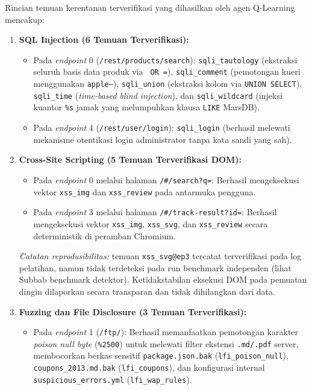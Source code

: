 \begin{enumerate}
Rincian temuan kerentanan terverifikasi yang dihasilkan oleh agen Q-Learning mencakup:
\begin{enumerate}
    \item \textbf{SQL Injection (6 Temuan Terverifikasi):}
    \begin{itemize}
        \item Pada \textit{endpoint} 0 (\texttt{/rest/products/search}): \texttt{sqli\_tautology} (ekstraksi seluruh basis data produk via \texttt{\textquotesingle\ OR \textquotesingle =}), \texttt{sqli\_comment} (pemotongan kueri menggunakan \texttt{apple\textquotesingle --}), \texttt{sqli\_union} (ekstraksi kolom via \texttt{UNION SELECT}), \texttt{sqli\_time} (\textit{time-based blind injection}), dan \texttt{sqli\_wildcard} (injeksi kuantor \texttt{\%s} jamak yang melumpuhkan klausa \texttt{LIKE} MarsDB).
        \item Pada \textit{endpoint} 4 (\texttt{/rest/user/login}): \texttt{sqli\_login} (berhasil melewati mekanisme otentikasi login administrator tanpa kata sandi yang sah).
    \end{itemize}
    \item \textbf{Cross-Site Scripting (5 Temuan Terverifikasi DOM):}
    \begin{itemize}
        \item Pada \textit{endpoint} 0 melalui halaman \texttt{/\#/search?q=}: Berhasil mengeksekusi vektor \texttt{xss\_img} dan \texttt{xss\_review} pada antarmuka pengguna.
        \item Pada \textit{endpoint} 3 melalui halaman \texttt{/\#/track-result?id=}: Berhasil mengeksekusi vektor \texttt{xss\_img}, \texttt{xss\_svg}, dan \texttt{xss\_review} secara deterministik di peramban Chromium.
    \end{itemize}
    \textit{Catatan reprodusibilitas:} temuan \texttt{xss\_svg@ep3} tercatat terverifikasi pada log pelatihan, namun tidak terdeteksi pada run benchmark independen (lihat Subbab benchmark detektor). Ketidakstabilan eksekusi DOM pada pemuatan dingin dilaporkan secara transparan dan tidak dihilangkan dari data. 
    \item \textbf{Fuzzing dan File Disclosure (3 Temuan Terverifikasi):}
    \begin{itemize}
        \item Pada \textit{endpoint} 1 (\texttt{/ftp/}): Berhasil memanfaatkan pemotongan karakter \textit{poison null byte} (\texttt{\%2500}) untuk melewati filter ekstensi \texttt{.md/.pdf} server, membocorkan berkas sensitif \texttt{package.json.bak} (\texttt{lfi\_poison\_null}), \texttt{coupons\_2013.md.bak} (\texttt{lfi\_coupons}), dan konfigurasi internal \texttt{suspicious\_errors.yml} (\texttt{lfi\_wap\_rules}).
    \end{itemize}
\end{enumerate}



\end{enumerate}

